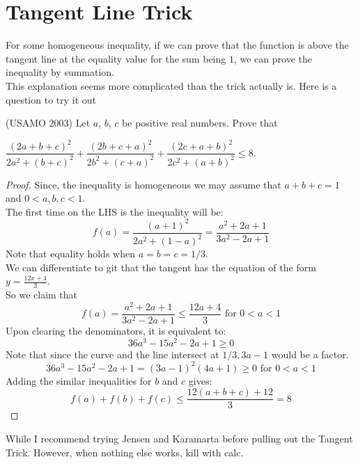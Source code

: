 \section{Tangent Line Trick}
For some homogeneous inequality, if we can prove that the function is above the tangent line at the equality value for the sum being $1$, we can prove the inequality by summation.\\
This explanation seems more complicated than the trick actually is. Here is a question to try it out\\
\begin{example}
(USAMO 2003) Let $a$, $b$, $c$ be positive real numbers. Prove that

$\dfrac{(2a + b + c)^2}{2a^2 + (b + c)^2} + \dfrac{(2b + c + a)^2}{2b^2 + (c + a)^2} + \dfrac{(2c + a + b)^2}{2c^2 + (a + b)^2} \le 8.$
\end{example}
\begin{proof}
Since, the inequality is homogeneous we may assume that $a+b+c=1$ and $0<a,b, c<1$.\\
The first time on the LHS is the inequality will be:
\[f(a)=\frac{(a+1)^2}{2a^2+(1-a)^2}=\frac{a^2+2a+1}{3a^2-2a+1}\]
Note that equality holds when $a=b=c=1/3$.\\
We can differentiate to git that the tangent has the equation of the form $y=\frac{12x+4}{3}$.\\
So we claim that
\[f(a) = \frac{a^2+2a+1}{3a^2-2a+1} \leq \frac{12a+4}{3} \text{ for } 0 <a <1\]
Upon clearing the denominators, it is equivalent to:
\[36a^3-15a^2-2a+1 \geq 0\]
Note that since the curve and the line intersect at $1/3, 3a-1$ would be a factor.
\[36a^3-15a^2-2a+1 = (3a-1)^2(4a+1) \geq 0 \text{ for } 0<a<1\]
Adding the similar inequalities for $b$ and $c$ gives:
\[f(a)+f(b)+f(c) \leq \frac{12(a+b+c) +12}{3} = 8\]
\end{proof}
While I recommend trying Jensen and Karamarta before pulling out the Tangent Trick. However, when nothing else works, kill with calc.\\
